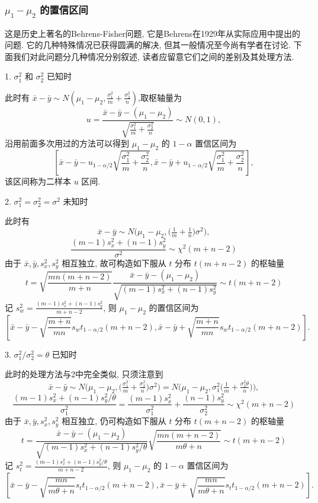 \subsubsection{$\mu_1-\mu_2$ 的置信区间}\label{sssec:6.5.5.1}

这是历史上著名的Behrens-Fisher问题, 它是Behrens在1929年从实际应用中提出的问题. 它的几种特殊情况已获得圆满的解决, 但其一般情况至今尚有学者在讨论. 下面我们对此问题分几种情况分别叙述, 读者应留意它们之间的差别及其处理方法.

1. $\sigma_1^2$ 和 $\sigma_2^2$ 已知时

此时有 $\bar x-\bar y\sim N\left(\mu_1-\mu_2,\frac{\sigma_1^2}{m}+\frac{\sigma_2^2}{n}\right)$,取枢轴量为
\[u=\frac{\bar x-\bar y-(\mu_1-\mu_2)}{\sqrt{\frac{\sigma_1^2}{m}+\frac{\sigma_2^2}{n}}}\sim N(0,1),\]
沿用前面多次用过的方法可以得到 $\mu_1-\mu_2$ 的 $1-\alpha$ 置信区间为
\[\left[\bar x-\bar y-u_{1-\alpha/2}\sqrt{\frac{\sigma_1^2}{m}+\frac{\sigma_2^2}{n}},\bar x-\bar y+u_{1-\alpha/2}\sqrt{\frac{\sigma_1^2}{m}+\frac{\sigma_2^2}{n}}\right],\]
该区间称为二样本 $u$ 区间.

2. $\sigma_1^2=\sigma_2^2=\sigma^2$ 未知时

此时有
\[\bar x-\bar y\sim N\big(\mu_1-\mu_2,\big(\tfrac{1}{m}+\tfrac{1}{n}\big)\sigma^2\big),\]
\[\frac{(m-1)s_x^2+(n-1)s_y^2}{\sigma^2}\sim\chi^2(m+n-2)\]
由于 $\bar x, \bar y, s_x^2,s_y^2$ 相互独立, 故可构造如下服从 $t$ 分布 $t(m+n-2)$ 的枢轴量
\[t=\sqrt{\frac{mn(m+n-2)}{m+n}}\frac{\bar x-\bar y-(\mu_1-\mu_2)}{\sqrt{(m-1)s_x^2+(n-1)s_y^2}}\sim t(m+n-2)\]
记 $s_w^2=\frac{(m-1)s_x^2+(n-1)s_y^2}{m+n-2}$, 则 $\mu_1-\mu_2$ 的置信区间为
\[\left[\bar x-\bar y-\sqrt{\frac{m+n}{mn}}s_wt_{1-\alpha/2}(m+n-2),\bar x-\bar y+\sqrt{\frac{m+n}{mn}}s_wt_{1-\alpha/2}(m+n-2)\right].\]

3. $\sigma_1^2/\sigma_2^2=\theta$ 已知时

此时的处理方法与2中完全类似, 只须注意到
\[\bar x-\bar y\sim N\big(\mu_1-\mu_2,\big(\tfrac{\sigma_1^2}{m}+\tfrac{\sigma_2^2}{n}\big)\sigma^2\big)=N\big(\mu_1-\mu_2,\sigma_1^2\big(\tfrac{1}{m}+\tfrac{\sigma_2^2\theta}{n}\big)\big),\]
\[\frac{(m-1)s_x^2+(n-1)s_y^2/\theta}{\sigma_1^2}=\frac{(m-1)s_x^2}{\sigma_1^2}+\frac{(n-1)s_y^2}{\sigma_2^2}\sim\chi^2(m+n-2)\]
由于 $\bar x, \bar y, s_x^2,s_y^2$ 相互独立, 仍可构造如下服从 $t$ 分布 $t(m+n-2)$ 的枢轴量
\[t=\frac{\bar x-\bar y-(\mu_1-\mu_2)}{\sqrt{(m-1)s_x^2+(n-1)s_y^2/\theta}}\sqrt{\frac{mn(m+n-2)}{m\theta+n}}\sim t(m+n-2)\]
记 $s_t^2=\frac{(m-1)s_x^2+(n-1)s_y^2/\theta}{m+n-2}$, 则 $\mu_1-\mu_2$ 的 $1-\alpha$ 置信区间为
\[\left[\bar x-\bar y-\sqrt{\frac{mn}{m\theta+n}}s_tt_{1-\alpha/2}(m+n-2),\bar x-\bar y+\sqrt{\frac{mn}{m\theta+n}}s_tt_{1-\alpha/2}(m+n-2)\right].\]

